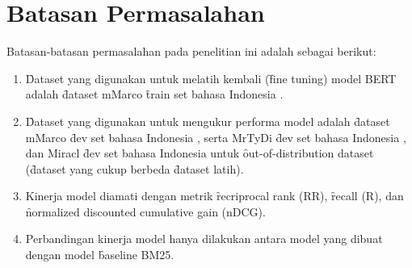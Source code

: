 \section{Batasan Permasalahan}
Batasan-batasan permasalahan pada penelitian ini adalah sebagai berikut:
\begin{enumerate}
	\item \f{Dataset} yang digunakan untuk melatih kembali (\f{fine tuning}) model BERT adalah \f{dataset} mMarco \f{train set} bahasa Indonesia \citep{mmarco}.
	\item \f{Dataset} yang digunakan untuk mengukur performa model adalah \f{dataset} mMarco \f{dev set} bahasa Indonesia \citep{mmarco}, serta MrTyDi \f{dev set} bahasa Indonesia \citep{mrtydi}, dan Miracl \f{dev set} bahasa Indonesia \citep{miracl} untuk \f{out-of-distribution dataset} (\f{dataset} yang cukup berbeda  \f{dataset} latih).
    \item Kinerja model diamati dengan metrik \f{recriprocal rank} (RR), \f{recall} (R), dan \f{normalized discounted cumulative gain} (nDCG).
    \item Perbandingan kinerja model hanya dilakukan antara model yang dibuat dengan model \f{baseline} BM25.
\end{enumerate}
